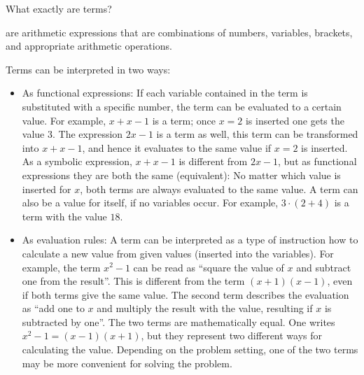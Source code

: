 \begin{MIntro}
What exactly are terms? 
\begin{MInfo}
 are arithmetic expressions that are combinations of numbers, variables, 
brackets, and appropriate arithmetic operations.
\end{MInfo}

Terms can be interpreted in two ways:
\begin{itemize}
\item{As functional expressions: If each variable contained in the term is substituted with a specific number, 
the term can be evaluated to a certain value. For example, $x+x-1$ is a term; once $x=2$ is inserted one gets the value $3$. The
expression $2x-1$ is a term as well, this term can be transformed into $x+x-1$, and hence it evaluates to the same value if $x=2$ is 
inserted. As a symbolic expression, $x+x-1$ is different from $2x-1$, but as functional expressions they are both the same (equivalent): 
No matter which value is inserted for $x$, both terms are always evaluated to the same value. A term can also be a value for itself, 
if no variables occur. For example, $3\cdot (2+4)$ is a term with the value $18$.}
\item{As evaluation rules: A term can be interpreted as a type of instruction how to calculate a new value from given values 
(inserted into the variables). For example, the term $x^2-1$ can be read as 
``square the value of $x$ and subtract one from the result''. This is different from
the term $(x+1)(x-1)$, even if both terms give the same value. The second term describes the evaluation as  
``add one to $x$ and multiply the result with the value, resulting if $x$ is subtracted by one''. The two terms are 
mathematically equal. One writes $x^2-1=(x-1)(x+1)$, but they represent two different ways for calculating the value. Depending on 
the problem setting, one of the two terms may be more convenient for solving the problem.}
\end{itemize}

\end{MIntro}


